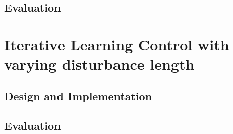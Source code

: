 \subsection{Evaluation}
\section{Iterative Learning Control with varying disturbance length}
\subsection{Design and Implementation}
\subsection{Evaluation}
%
%
%
